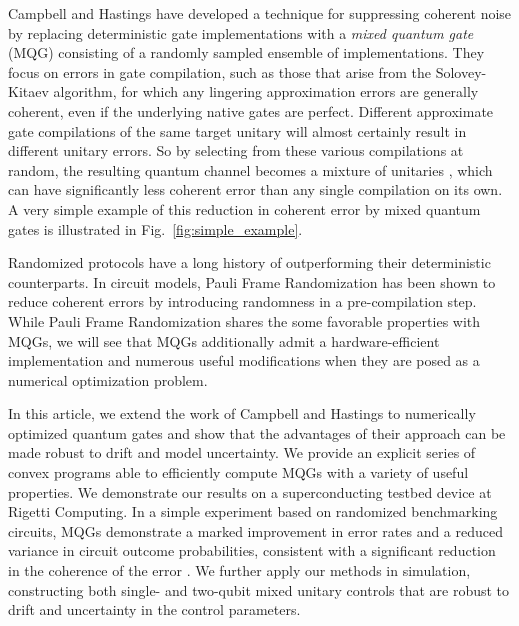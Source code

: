 \documentclass[aps,nofootinbib,pra,notitlepage,twocolumn]{revtex4-1}
\newcommand{\0}{\ensuremath{\mathbf{0}}}
\begin{document}
Campbell \cite{Campbell2017,1811.08017} and Hastings \cite{Hastings2017} have developed a technique for suppressing coherent noise by replacing deterministic gate implementations with a \emph{mixed quantum gate} (MQG) consisting of a randomly sampled ensemble of implementations. They focus on errors in gate compilation, such as those that arise from the Solovey-Kitaev algorithm, for which any lingering approximation errors are generally coherent, even if the underlying native gates are perfect. Different approximate gate compilations of the same target unitary will almost certainly result in different unitary errors. So by selecting from these various compilations at random, the resulting quantum channel becomes a mixture of unitaries \cite{DBLP:journals/corr/cs-CC-0012017}, which can have significantly less coherent error than any single compilation on its own. A very simple example of this reduction in coherent error by mixed quantum gates is illustrated in Fig.~\ref{fig:simple_example}. 

Randomized protocols have a long history of outperforming their deterministic counterparts\cite{Viola2005, Santos2006}. In circuit models, Pauli Frame Randomization \cite{Wallman2016, 1803.01818} has been shown to reduce coherent errors by introducing randomness in a pre-compilation step. While Pauli Frame Randomization shares the some favorable properties with MQGs, we will see that MQGs additionally admit a hardware-efficient implementation and numerous useful modifications when they are posed as a numerical optimization problem.

In this article, we extend the work of Campbell and Hastings to numerically optimized quantum gates and show that the advantages of their approach can be made robust to drift and model uncertainty. We provide an explicit series of convex programs able to efficiently compute MQGs with a variety of useful properties. We demonstrate our results on a superconducting testbed device at Rigetti Computing.  In a simple experiment based on randomized benchmarking circuits, MQGs demonstrate a marked improvement in error rates and a reduced variance in circuit outcome probabilities, consistent with a significant reduction in the coherence of the error \cite{Ball2016}. We further apply our methods in simulation, constructing both single- and two-qubit mixed unitary controls that are robust to drift and uncertainty in the control parameters.


\end{document}
